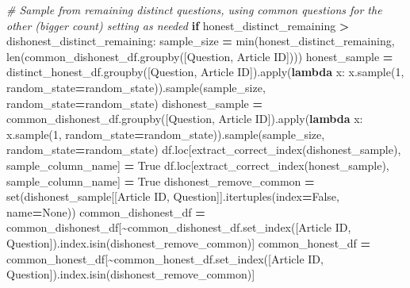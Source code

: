 \documentclass[
]{article}
\newenvironment{Shaded}{\begin{snugshade}}{\end{snugshade}}
\newcommand{\BuiltInTok}[1]{#1}
\newcommand{\CommentTok}[1]{\textcolor[rgb]{0.56,0.35,0.01}{\textit{#1}}}
\newcommand{\ControlFlowTok}[1]{\textcolor[rgb]{0.13,0.29,0.53}{\textbf{#1}}}
\newcommand{\DecValTok}[1]{\textcolor[rgb]{0.00,0.00,0.81}{#1}}
\newcommand{\KeywordTok}[1]{\textcolor[rgb]{0.13,0.29,0.53}{\textbf{#1}}}
\newcommand{\NormalTok}[1]{#1}
\newcommand{\OperatorTok}[1]{\textcolor[rgb]{0.81,0.36,0.00}{\textbf{#1}}}
\newcommand{\StringTok}[1]{\textcolor[rgb]{0.31,0.60,0.02}{#1}}
\newcommand{\VariableTok}[1]{\textcolor[rgb]{0.00,0.00,0.00}{#1}}
\begin{document}
\begin{Shaded}
\begin{Highlighting}[]
    \CommentTok{\# Sample from remaining distinct questions, using common questions for the other (bigger count) setting as needed}
    \ControlFlowTok{if}\NormalTok{ honest\_distinct\_remaining }\OperatorTok{\textgreater{}}\NormalTok{ dishonest\_distinct\_remaining:}
\NormalTok{        sample\_size }\OperatorTok{=} \BuiltInTok{min}\NormalTok{(honest\_distinct\_remaining, }\BuiltInTok{len}\NormalTok{(common\_dishonest\_df.groupby([}\StringTok{\textquotesingle{}Question\textquotesingle{}}\NormalTok{, }\StringTok{\textquotesingle{}Article ID\textquotesingle{}}\NormalTok{])))}
\NormalTok{        honest\_sample }\OperatorTok{=}\NormalTok{ distinct\_honest\_df.groupby([}\StringTok{\textquotesingle{}Question\textquotesingle{}}\NormalTok{, }\StringTok{\textquotesingle{}Article ID\textquotesingle{}}\NormalTok{]).}\BuiltInTok{apply}\NormalTok{(}\KeywordTok{lambda}\NormalTok{ x: x.sample(}\DecValTok{1}\NormalTok{, random\_state}\OperatorTok{=}\NormalTok{random\_state)).sample(sample\_size, random\_state}\OperatorTok{=}\NormalTok{random\_state)}
\NormalTok{        dishonest\_sample }\OperatorTok{=}\NormalTok{ common\_dishonest\_df.groupby([}\StringTok{\textquotesingle{}Question\textquotesingle{}}\NormalTok{, }\StringTok{\textquotesingle{}Article ID\textquotesingle{}}\NormalTok{]).}\BuiltInTok{apply}\NormalTok{(}\KeywordTok{lambda}\NormalTok{ x: x.sample(}\DecValTok{1}\NormalTok{, random\_state}\OperatorTok{=}\NormalTok{random\_state)).sample(sample\_size, random\_state}\OperatorTok{=}\NormalTok{random\_state)}
\NormalTok{        df.loc[extract\_correct\_index(dishonest\_sample), sample\_column\_name] }\OperatorTok{=} \VariableTok{True}
\NormalTok{        df.loc[extract\_correct\_index(honest\_sample), sample\_column\_name] }\OperatorTok{=} \VariableTok{True}
\NormalTok{        dishonest\_remove\_common }\OperatorTok{=} \BuiltInTok{set}\NormalTok{(dishonest\_sample[[}\StringTok{\textquotesingle{}Article ID\textquotesingle{}}\NormalTok{, }\StringTok{\textquotesingle{}Question\textquotesingle{}}\NormalTok{]].itertuples(index}\OperatorTok{=}\VariableTok{False}\NormalTok{, name}\OperatorTok{=}\VariableTok{None}\NormalTok{))}
\NormalTok{        common\_dishonest\_df }\OperatorTok{=}\NormalTok{ common\_dishonest\_df[}\OperatorTok{\textasciitilde{}}\NormalTok{common\_dishonest\_df.set\_index([}\StringTok{\textquotesingle{}Article ID\textquotesingle{}}\NormalTok{, }\StringTok{\textquotesingle{}Question\textquotesingle{}}\NormalTok{]).index.isin(dishonest\_remove\_common)]}
\NormalTok{        common\_honest\_df }\OperatorTok{=}\NormalTok{ common\_honest\_df[}\OperatorTok{\textasciitilde{}}\NormalTok{common\_honest\_df.set\_index([}\StringTok{\textquotesingle{}Article ID\textquotesingle{}}\NormalTok{, }\StringTok{\textquotesingle{}Question\textquotesingle{}}\NormalTok{]).index.isin(dishonest\_remove\_common)]}

\end{Highlighting}
\end{Shaded}
\end{document}
